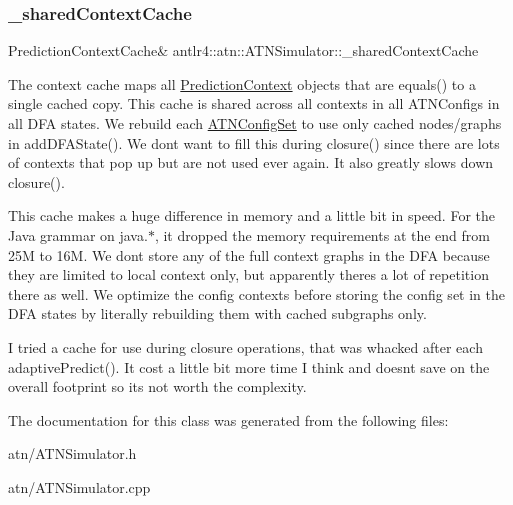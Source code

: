 \subsubsection{\texorpdfstring{\+\_\+shared\+Context\+Cache}{\_sharedContextCache}}
{\footnotesize\ttfamily Prediction\+Context\+Cache\& antlr4\+::atn\+::\+A\+T\+N\+Simulator\+::\+\_\+shared\+Context\+Cache\hspace{0.3cm}{\ttfamily [protected]}}



The context cache maps all \hyperlink{classantlr4_1_1atn_1_1PredictionContext}{Prediction\+Context} objects that are equals() to a single cached copy. This cache is shared across all contexts in all A\+T\+N\+Configs in all D\+FA states. We rebuild each \hyperlink{classantlr4_1_1atn_1_1ATNConfigSet}{A\+T\+N\+Config\+Set} to use only cached nodes/graphs in add\+D\+F\+A\+State(). We don\textquotesingle{}t want to fill this during closure() since there are lots of contexts that pop up but are not used ever again. It also greatly slows down closure(). 

This cache makes a huge difference in memory and a little bit in speed. For the Java grammar on java.$\ast$, it dropped the memory requirements at the end from 25M to 16M. We don\textquotesingle{}t store any of the full context graphs in the D\+FA because they are limited to local context only, but apparently there\textquotesingle{}s a lot of repetition there as well. We optimize the config contexts before storing the config set in the D\+FA states by literally rebuilding them with cached subgraphs only. 

I tried a cache for use during closure operations, that was whacked after each adaptive\+Predict(). It cost a little bit more time I think and doesn\textquotesingle{}t save on the overall footprint so it\textquotesingle{}s not worth the complexity. 



The documentation for this class was generated from the following files\+:\begin{DoxyCompactItemize}
\item 
atn/A\+T\+N\+Simulator.\+h\item 
atn/A\+T\+N\+Simulator.\+cpp\end{DoxyCompactItemize}
